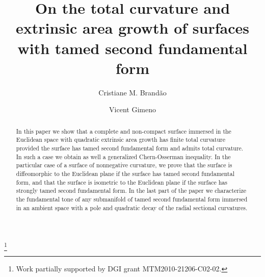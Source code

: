 \documentclass[a4paper]{amsart}
\theoremstyle{definition}
\numberwithin{equation}{section}
\begin{document}
  \title[Total curvature and area growth of  tamed surfaces]{On the total curvature and extrinsic area growth of surfaces with tamed second fundamental form}

\author{Cristiane M. Brand\~ao}      
\address{Departamento de Matem\'atica universidade do Cear\'a-UFC, 60455-760 Fortaleza, CE, Brazil                       }

 

\author{Vicent Gimeno}      
\address{Department of Mathematics-INIT-IMAC, Universitat Jaume I, Castell\'o de la Plana, Spain                        
}

\thanks{Work partially supported by DGI grant MTM2010-21206-C02-02.}

 
\begin{abstract}
In this paper we show that a complete and non-compact surface immersed in the Euclidean space with quadratic extrinsic area growth has finite total curvature provided the surface has tamed second fundamental form and admits total curvature. In such a case we obtain  as well a generalized Chern-Osserman inequality. In the particular case of a surface of nonnegative curvature, we prove that the surface is diffeomorphic to the Euclidean plane if the surface has tamed second fundamental form, and that the surface is isometric to the Euclidean plane if the surface has strongly tamed second fundamental form.  In the last part of the paper  we characterize the fundamental tone of any submanifold of tamed second fundamental form immersed in an ambient space with a pole and quadratic decay of the radial sectional curvatures.  

\end{abstract}

\maketitle
\end{document}
